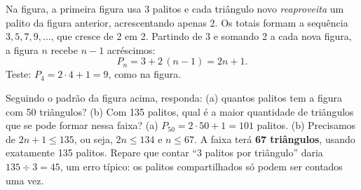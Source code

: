 \begin{center}
\end{center}

Na figura, a primeira figura usa 3 palitos e cada triângulo novo
\emph{reaproveita} um palito da figura anterior, acrescentando apenas 2. Os
totais formam a sequência $3, 5, 7, 9, \dots$, que cresce de 2 em 2. Partindo de
3 e somando 2 a cada nova figura, a figura $n$ recebe $n-1$ acréscimos:
\[
P_n = 3 + 2\,(n-1) = 2n + 1 .
\]
Teste: $P_4 = 2\cdot 4 + 1 = 9$, como na figura.

\begin{exemplo}
Seguindo o padrão da figura acima, responda: (a) quantos palitos tem a figura
com 50 triângulos? (b) Com 135 palitos, qual é a maior quantidade de
triângulos que se pode formar nessa faixa?
\solucao
(a) $P_{50} = 2\cdot 50 + 1 = 101$ palitos.
(b) Precisamos de $2n + 1 \le 135$, ou seja, $2n \le 134$ e $n \le 67$. A faixa
terá \textbf{67 triângulos}, usando exatamente 135 palitos. Repare que contar
“3 palitos por triângulo” daria $135 \div 3 = 45$, um erro típico: os palitos
compartilhados só podem ser contados uma vez.
\end{exemplo}

